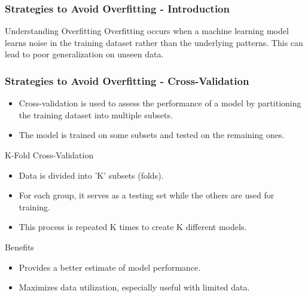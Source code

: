 \documentclass[aspectratio=169]{beamer}
\begin{document}
\begin{frame}[fragile]
    \frametitle{Strategies to Avoid Overfitting - Introduction}
    \begin{block}{Understanding Overfitting}
        Overfitting occurs when a machine learning model learns noise in the training dataset rather than the underlying patterns. This can lead to poor generalization on unseen data.
    \end{block}
\end{frame}

\begin{frame}[fragile]
    \frametitle{Strategies to Avoid Overfitting - Cross-Validation}
    \begin{itemize}
        \item Cross-validation is used to assess the performance of a model by partitioning the training dataset into multiple subsets.
        \item The model is trained on some subsets and tested on the remaining ones.
    \end{itemize}
    
    \begin{block}{K-Fold Cross-Validation}
        \begin{itemize}
            \item Data is divided into 'K' subsets (folds).
            \item For each group, it serves as a testing set while the others are used for training.
            \item This process is repeated K times to create K different models.
        \end{itemize}
    \end{block}
    
    \begin{block}{Benefits}
        \begin{itemize}
            \item Provides a better estimate of model performance.
            \item Maximizes data utilization, especially useful with limited data.
        \end{itemize}
    \end{block}
\end{frame}
\end{document}
